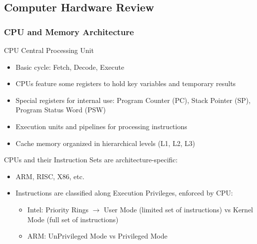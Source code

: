 \columnbreak

\subsection{Computer Hardware Review}

\subsubsection{CPU and Memory Architecture}

\begin{definition}{CPU} Central Processing Unit
    \begin{itemize}
        \item Basic cycle: Fetch, Decode, Execute
        \item CPUs feature some registers to hold key variables and temporary results
        \item Special registers for internal use: Program Counter (PC), Stack Pointer (SP), Program Status Word (PSW)
        \item Execution units and pipelines for processing instructions
        \item Cache memory organized in hierarchical levels (L1, L2, L3)
    \end{itemize}
    \vspace{1mm}
    CPUs and their Instruction Sets are architecture-specific:
    \begin{itemize}
        \item ARM, RISC, X86, etc.
        \item Instructions are classified along Execution Privileges, enforced by CPU:
        \begin{itemize}
            \item Intel: Priority Rings $\rightarrow$ User Mode (limited set of instructions) vs Kernel Mode (full set of instructions)
            \item ARM: UnPrivileged Mode vs Privileged Mode
        \end{itemize}
    \end{itemize}
\end{definition}



